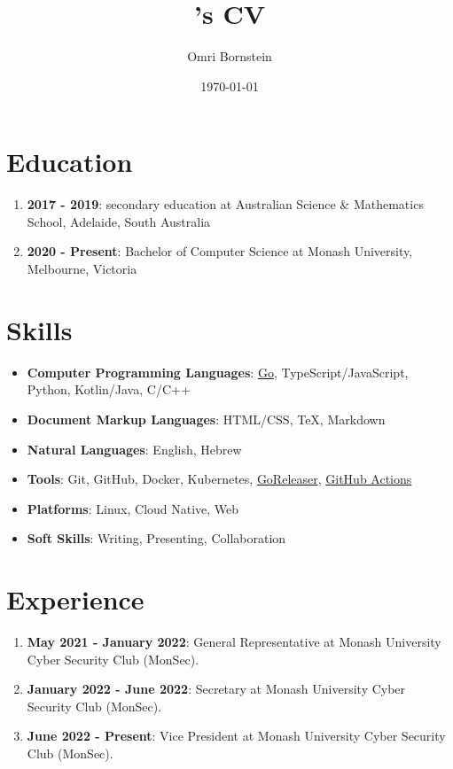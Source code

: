 \documentclass[a4paper, 10pt]{article}
\author{Omri Bornstein}
\title{\theauthor's CV}
\date{\today}
\begin{document}
	\section{Education}

	\begin{enumerate}
		\item \textbf{2017 - 2019}: secondary education at Australian Science \& Mathematics School, Adelaide, South Australia
		\item \textbf{2020 - Present}: Bachelor of Computer Science at Monash University, Melbourne, Victoria
	\end{enumerate}

	\section{Skills}

	\begin{itemize}
		\item \textbf{Computer Programming Languages}: \href{https://go.dev}{Go}, TypeScript/JavaScript, Python, Kotlin/Java, C/C++
		\item \textbf{Document Markup Languages}: HTML/CSS, \TeX, Markdown
		\item \textbf{Natural Languages}: English, Hebrew
		\item \textbf{Tools}: Git, GitHub, Docker, Kubernetes, \href{https://goreleaser.com}{GoReleaser}, \href{https://github.com/features/actions}{GitHub Actions}
		\item \textbf{Platforms}: Linux, Cloud Native, Web
		\item \textbf{Soft Skills}: Writing, Presenting, Collaboration
	\end{itemize}

	\section{Experience}

	\begin{enumerate}
		\item \textbf{May 2021 - January 2022}: General Representative at Monash University Cyber Security Club (MonSec).
		\item \textbf{January 2022 - June 2022}: Secretary at Monash University Cyber Security Club (MonSec).
		\item \textbf{June 2022 - Present}: Vice President at Monash University Cyber Security Club (MonSec).
	\end{enumerate}
\end{document}
